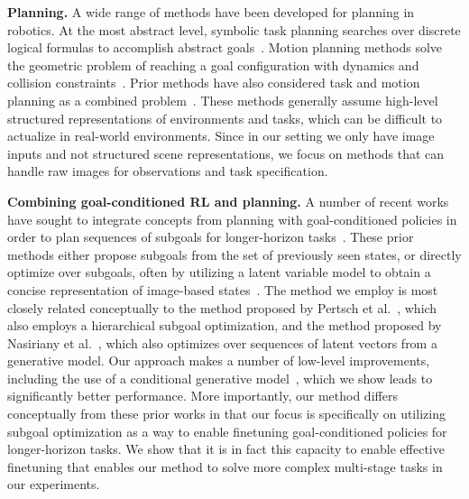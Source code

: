 \textbf{Planning.} A wide range of methods have been developed for planning in robotics. At the most abstract level, symbolic task planning searches over discrete logical formulas to accomplish abstract goals~\cite{fikes1971strips}. Motion planning methods solve the geometric problem of reaching a goal configuration with dynamics and collision constraints~\cite{Kavraki1996, koenig2002dstarlite,  karaman2011rrtstar, zucker2013chomp, kalakrishnan2011stomp}. Prior methods have also considered task and motion planning as a combined problem~\cite{srivastava14tamp}. These methods generally assume high-level structured representations of environments and tasks, which can be difficult to actualize in real-world environments. Since in our setting we only have image inputs and not structured scene representations, we focus on methods that can handle raw images for observations and task specification.

\textbf{Combining goal-conditioned RL and planning.}
A number of recent works have sought to integrate concepts from planning with goal-conditioned policies in order to plan sequences of subgoals for longer-horizon tasks~\cite{Nasiriany2019PlanningWG, Eysenbach2019SearchOT, fang2019cavin, Charlesworth2020PlanGANMP, Pertsch2020LongHorizonVP, Sharma2021AutonomousRL, Zhang2021CPlanningAA}. These prior methods either propose subgoals from the set of previously seen states, or directly optimize over subgoals, often by utilizing a latent variable model to obtain a concise representation of image-based states~\cite{nair2018rig,ichter2018learning,nair2019hierarchical,Nasiriany2019PlanningWG,Pertsch2020LongHorizonVP, Khazatsky2021WhatCI, ChaneSane2021GoalConditionedRL}. 
The method we employ is most closely related conceptually to the method proposed by Pertsch et al.~\cite{Pertsch2020LongHorizonVP}, which also employs a hierarchical subgoal optimization, and the method proposed by Nasiriany et al.~\cite{Nasiriany2019PlanningWG}, which also optimizes over sequences of latent vectors from a generative model. Our approach makes a number of low-level improvements, including the use of a conditional generative model~\cite{Nair2019ContextualIG}, which we show leads to significantly better performance. More importantly, our method differs conceptually from these prior works in that our focus is specifically on utilizing subgoal optimization as a way to enable finetuning goal-conditioned policies for longer-horizon tasks. We show that it is in fact this capacity to enable effective finetuning that enables our method to solve more complex multi-stage tasks in our experiments.

